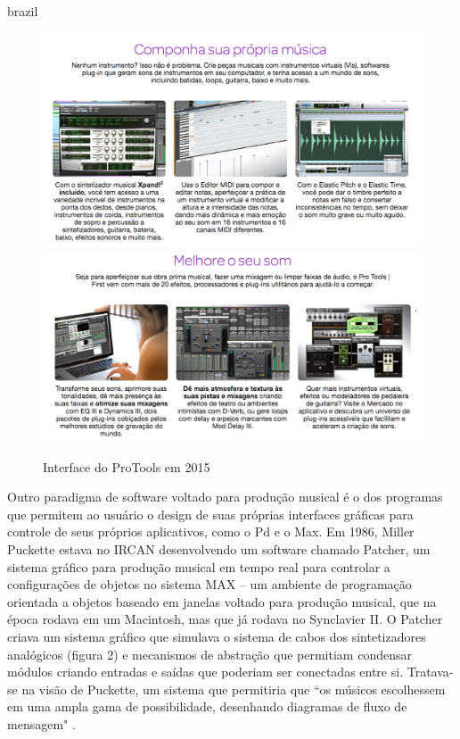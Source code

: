\begin{otherlanguage*}{brazil}
\begin{figure}[ht]
    \caption{\label{protools}Interface do ProTools em 2015 }
    \begin{center}
        \includegraphics[width=1\linewidth]{pictures/protools}
        \includegraphics[width=1\linewidth]{pictures/protools2}
    \end{center}
\end{figure}

Outro paradigma de software voltado para produção musical é o dos programas que permitem ao usuário o design de suas próprias interfaces gráficas para controle de seus próprios aplicativos, como o Pd e o Max. Em 1986, Miller Puckette estava no IRCAN desenvolvendo um software chamado Patcher, um sistema gráfico para produção musical em tempo real para controlar a configurações de objetos no sistema MAX – um ambiente de programação orientada a objetos baseado em janelas voltado para produção musical, que na época rodava em um Macintosh, mas que já rodava no Synclavier II. O Patcher criava um sistema gráfico que simulava o sistema de cabos dos sintetizadores analógicos (figura 2) e mecanismos de abstração que permitiam condensar módulos criando entradas e saídas que poderiam ser conectadas entre si. Tratava-se na visão de Puckette, um sistema que permitiria que ``os músicos escolhessem em uma ampla gama de possibilidade, desenhando diagramas de fluxo de mensagem" \cite[5]{PucketteMiller}. 


\end{otherlanguage*}
